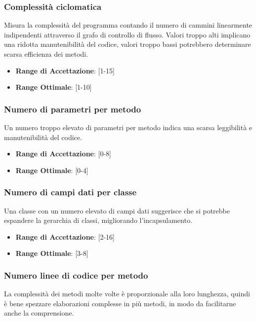 \documentclass[12pt,a4paper]{article}
\begin{document}
	\subsubsection{Complessità ciclomatica}
	Misura la complessità del programma contando il numero di cammini linearmente indipendenti attraverso il grafo di controllo di flusso. Valori troppo alti implicano una ridotta manutenibilità del codice, valori troppo bassi potrebbero determinare scarsa efficienza dei metodi.
	
	\begin{itemize}
		\item \textbf{Range di Accettazione}: [1-15]
		\item \textbf{Range Ottimale}: [1-10]
	\end{itemize}
	
	\subsubsection{Numero di parametri per metodo}
	Un numero troppo elevato di parametri per metodo indica una scarsa leggibilità e manutenibilità del codice.
	
	\begin{itemize}
		\item \textbf{Range di Accettazione}: [0-8]
		\item \textbf{Range Ottimale}: [0-4]
	\end{itemize}
	
	\subsubsection{Numero di campi dati per classe}
	Una classe con un numero elevato di campi dati suggerisce che si potrebbe espandere la gerarchia di classi, migliorando l'incapsulamento.
	
	\begin{itemize}
		\item \textbf{Range di Accettazione}: [2-16]
		\item \textbf{Range Ottimale}: [3-8]
	\end{itemize}
	
	\subsubsection{Numero linee di codice per metodo}
	La complessità dei metodi molte volte è proporzionale alla loro lunghezza, quindi è bene spezzare elaborazioni complesse in più metodi, in modo da facilitarne anche la comprensione.
	
\end{document}
